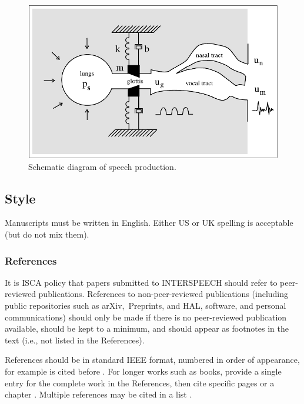 \documentclass{INTERSPEECH2023}
\begin{document}
\begin{figure}[t]
  \centering
  \includegraphics[width=\linewidth]{figure.pdf}
  \caption{Schematic diagram of speech production.}
  \label{fig:speech_production}
\end{figure}


\subsection{Style}

Manuscripts must be written in English. Either US or UK spelling is acceptable (but do not mix them).

\subsubsection{References}
\label{section:references}

It is ISCA policy that papers submitted to INTERSPEECH should refer to peer-reviewed publications. References to non-peer-reviewed publications (including public repositories such as arXiv, Preprints, and HAL, software, and personal communications) should only be made if there is no peer-reviewed publication available, should be kept to a minimum, and should appear as footnotes in the text (i.e., not listed in the References). 

References should be in standard IEEE format, numbered in order of appearance, for example \cite{Davis80-COP} is cited before \cite{Rabiner89-ATO}. For longer works such as books, provide a single entry for the complete work in the References, then cite specific pages \cite[pp.\ 417--422]{Hastie09-TEO} or a chapter \cite[Chapter 2]{Hastie09-TEO}. Multiple references may be cited in a list \cite{Smith22-XXX, Jones22-XXX}.
\end{document}
